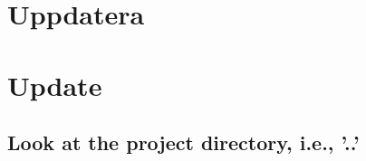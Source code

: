 \documentclass[../examplethesis]{subfiles}
\begin{document}
\ifinswedish
{}
\chapter*{Uppdatera}
\else
{}
\chapter*{Update}
\fi

\ShowFontCache

\UpdateFontCache


\ShowFontCache

\section{Look at the project directory, i.e., '..'}
\end{document}
